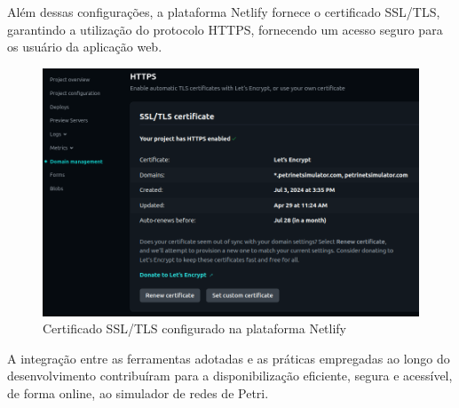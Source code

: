 \documentclass[
	12pt,				%
	openright,			%
	oneside,			%
	a4paper,			%
	english,			%
	brazil				%
	]{abntex2}
\begin{document}
Além dessas configurações, a plataforma Netlify fornece o certificado SSL/TLS, garantindo a utilização do protocolo HTTPS, fornecendo um acesso seguro para os usuário da aplicação web. 

\begin{figure}[ht] 
	\centering
	\includegraphics[scale=0.5]{figuras/netlify3.png}
	\caption[netlify 3]{Certificado SSL/TLS configurado na plataforma Netlify}
	\label{fig:netlify2}
\end{figure}
\FloatBarrier

A integração entre as ferramentas adotadas e as práticas empregadas ao longo do desenvolvimento contribuíram para a disponibilização eficiente, segura e acessível, de forma online, ao simulador de redes de Petri. 




\end{document}
